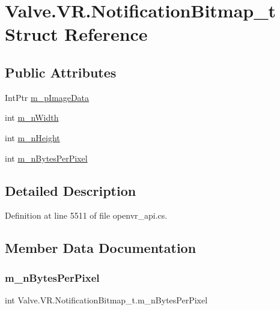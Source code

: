 \hypertarget{struct_valve_1_1_v_r_1_1_notification_bitmap__t}{}\section{Valve.\+V\+R.\+Notification\+Bitmap\+\_\+t Struct Reference}
\label{struct_valve_1_1_v_r_1_1_notification_bitmap__t}
\subsection*{Public Attributes}
\begin{DoxyCompactItemize}
\item 
Int\+Ptr \mbox{\hyperlink{struct_valve_1_1_v_r_1_1_notification_bitmap__t_a404bdb78acc61cd046234adc1b22abfd}{m\+\_\+p\+Image\+Data}}
\item 
int \mbox{\hyperlink{struct_valve_1_1_v_r_1_1_notification_bitmap__t_a81ff2fc6f66961fe9c2d795196f46071}{m\+\_\+n\+Width}}
\item 
int \mbox{\hyperlink{struct_valve_1_1_v_r_1_1_notification_bitmap__t_a1000770ed9683610226a9362c6161af8}{m\+\_\+n\+Height}}
\item 
int \mbox{\hyperlink{struct_valve_1_1_v_r_1_1_notification_bitmap__t_a75bc54415172f629043aaa3f152e7830}{m\+\_\+n\+Bytes\+Per\+Pixel}}
\end{DoxyCompactItemize}


\subsection{Detailed Description}


Definition at line 5511 of file openvr\+\_\+api.\+cs.



\subsection{Member Data Documentation}
\mbox{\label{struct_valve_1_1_v_r_1_1_notification_bitmap__t_a75bc54415172f629043aaa3f152e7830}} 
\subsubsection{\texorpdfstring{m\_nBytesPerPixel}{m\_nBytesPerPixel}}
{\footnotesize\ttfamily int Valve.\+V\+R.\+Notification\+Bitmap\+\_\+t.\+m\+\_\+n\+Bytes\+Per\+Pixel}



